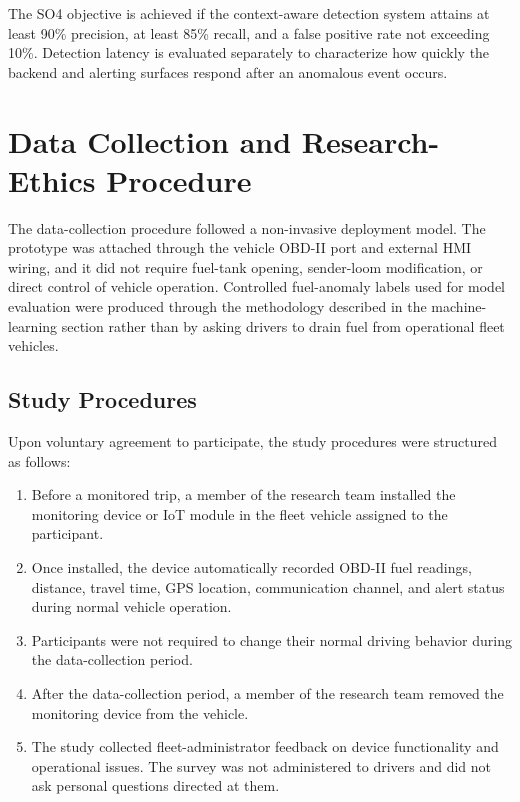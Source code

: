 \vspace{0.5em}
The SO4 objective is achieved if the context-aware detection system attains at least 90\% precision, at least 85\% recall, and a false positive rate not exceeding 10\%. Detection latency is evaluated separately to characterize how quickly the backend and alerting surfaces respond after an anomalous event occurs.

\section{Data Collection and Research-Ethics Procedure}

The data-collection procedure followed a non-invasive deployment model. The prototype was attached through the vehicle OBD-II port and external HMI wiring, and it did not require fuel-tank opening, sender-loom modification, or direct control of vehicle operation. Controlled fuel-anomaly labels used for model evaluation were produced through the methodology described in the machine-learning section rather than by asking drivers to drain fuel from operational fleet vehicles.

\subsection{Study Procedures}

Upon voluntary agreement to participate, the study procedures were structured as follows:

\begin{enumerate}[label=\textbf{(\alph*)}, leftmargin=*]
    \item Before a monitored trip, a member of the research team installed the monitoring device or IoT module in the fleet vehicle assigned to the participant.
    \item Once installed, the device automatically recorded OBD-II fuel readings, distance, travel time, GPS location, communication channel, and alert status during normal vehicle operation.
    \item Participants were not required to change their normal driving behavior during the data-collection period.
    \item After the data-collection period, a member of the research team removed the monitoring device from the vehicle.
    \item The study collected fleet-administrator feedback on device functionality and operational issues. The survey was not administered to drivers and did not ask personal questions directed at them.
\end{enumerate}

